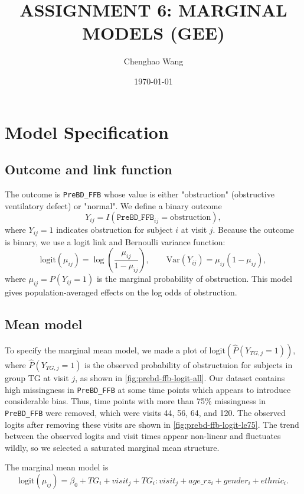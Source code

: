 \documentclass[12pt]{article}
\title{\Large\bfseries ASSIGNMENT 6: MARGINAL MODELS (GEE)}
\author{Chenghao Wang}
\date{\today}
\begin{document}
\maketitle

\section{Model Specification}

\subsection{Outcome and link function}

The outcome is \texttt{PreBD\_FFB} whose value is 
either "obstruction" (obstructive ventilatory defect) or "normal".
We define a binary outcome
\[
Y_{ij} = I(\texttt{PreBD\_FFB}_{ij} = \text{obstruction}),
\]
where $Y_{ij}=1$ indicates obstruction for subject $i$ at visit $j$.
Because the outcome is binary, we use a logit link and Bernoulli variance
function:
\[
\mathrm{logit}(\mu_{ij}) =
\log\left(\frac{\mu_{ij}}{1-\mu_{ij}}\right), \qquad
\mathrm{Var}(Y_{ij}) = \mu_{ij}(1-\mu_{ij}),
\]
where $\mu_{ij}=P(Y_{ij}=1)$ is the marginal probability of obstruction.
This model gives population-averaged effects on the log odds of obstruction.

\subsection{Mean model}

To specify the marginal mean model, we made a plot 
of $\mathrm{logit}(\hat{P}(Y_{TG,j} = 1))$, where
$\hat{P}(Y_{TG,j} = 1)$ is the observed probability of obstructuion
for subjects in group TG at visit $j$, as shown in \cref{fig:prebd-ffb-logit-all}.
Our dataset contains high missingness in
\texttt{PreBD\_FFB} at some time points
which appears to introduce considerable bias.
Thus, time points with more than 75\% missingness in
\texttt{PreBD\_FFB} were removed, which were visits 44, 56, 64, and 120.
The observed logits after removing these visits are shown in
\cref{fig:prebd-ffb-logit-le75}. The trend between the observed logits and visit times
appear non-linear and fluctuates wildly, so we selected a saturated marginal mean structure.

The marginal mean model is
\begin{equation}
\mathrm{logit}(\mu_{ij})
= \beta_0 + TG_i + visit_j + TG_i:visit_j
+ age\_rz_i + gender_i + ethnic_i.
\end{equation}
\end{document}
